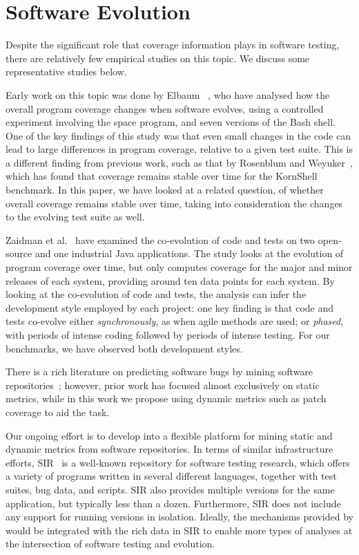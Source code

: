 \section{Software Evolution}
\label{related:evolution}

Despite the significant role that coverage information plays in
software testing, there are relatively few empirical studies on this
topic.  We discuss some representative studies below.

Early work on this topic was done by Elbaum \etal~\cite{cov-evol:icsm01}, who
have analysed how the overall program coverage changes when software evolves,
using a controlled experiment involving the \textsf{space} program, and seven
versions of the Bash shell.  One of the key findings of this study was that
even small changes in the code can lead to large differences in program
coverage, relative to a given test suite.  This is a different finding from
previous work, such as that by Rosenblum and Weyuker~\cite{cov_regr97}, which
has found that coverage remains stable over time for the KornShell benchmark.
In this paper, we have looked at a related question, of whether overall
coverage remains stable over time, taking into consideration the changes to the
evolving test suite as well.

Zaidman et al.~\cite{coevol:emse11} have examined the co-evolution of
code and tests on two open-source and one industrial Java
applications.  The study looks at the evolution of program coverage
over time, but only computes coverage for the major and minor releases
of each system, providing around ten data points for each system.  By
looking at the co-evolution of code and tests, the analysis can infer
the development style employed by each project: one key finding is
that code and tests co-evolve either \textit{synchronously}, as when
agile methods are used; or \textit{phased}, with periods of intense
coding followed by periods of intense testing.  For our
benchmarks, we have observed both development styles.

There is a rich literature on predicting software bugs by mining
software repositories~\cite{bug-feature:icse13,genealogies:issre13};
however, prior work has focused almost exclusively on static metrics,
while in this work we propose using dynamic metrics such as patch
coverage to aid the task.

Our ongoing effort is to develop \covrig into a flexible platform for
mining static and dynamic metrics from software repositories.  In
terms of similar infrastructure efforts, SIR~\cite{sir:2005} is a
well-known repository for software testing research, which offers a
variety of programs written in several different languages, together
with test suites, bug data, and scripts.  SIR also provides multiple
versions for the same application, but typically less than a dozen.
Furthermore, SIR does not include any support for running versions in
isolation.  Ideally, the mechanisms provided by \covrig would be
integrated with the rich data in SIR to enable more types of analyses
at the intersection of software testing and evolution.


